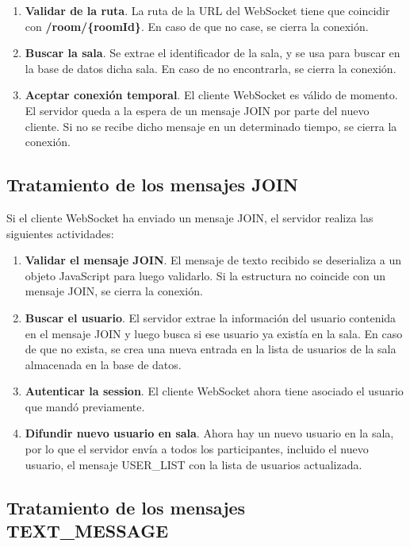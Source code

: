\begin{enumerate}
  \item \textbf{Validar de la ruta}. La ruta de la URL del WebSocket tiene que coincidir con \textbf{/room/\{roomId\}}. En caso de que no case, se cierra la conexión.
  \item \textbf{Buscar la sala}. Se extrae el identificador de la sala, y se usa para buscar en la base de datos dicha sala. En caso de no encontrarla, se cierra la conexión.
  \item \textbf{Aceptar conexión temporal}. El cliente WebSocket es válido de momento. El servidor queda a la espera de un mensaje JOIN por parte del nuevo cliente. Si no se recibe dicho mensaje en un determinado tiempo, se cierra la conexión.
\end{enumerate}

\subsection{Tratamiento de los mensajes JOIN}

Si el cliente WebSocket ha enviado un mensaje JOIN, el servidor realiza las siguientes actividades:

\begin{enumerate}
  \item \textbf{Validar el mensaje JOIN}. El mensaje de texto recibido se deserializa a un objeto JavaScript para luego validarlo. Si la estructura no coincide con un mensaje JOIN, se cierra la conexión.
  \item \textbf{Buscar el usuario}. El servidor extrae la información del usuario contenida en el mensaje JOIN y luego busca si ese usuario ya existía en la sala. En caso de que no exista, se crea una nueva entrada en la lista de usuarios de la sala almacenada en la base de datos.
  \item \textbf{Autenticar la session}. El cliente WebSocket ahora tiene asociado el usuario que mandó previamente.
  \item \textbf{Difundir nuevo usuario en sala}. Ahora hay un nuevo usuario en la sala, por lo que el servidor envía a todos los participantes, incluido el nuevo usuario, el mensaje USER\_LIST con la lista de usuarios actualizada.
\end{enumerate}

\subsection{Tratamiento de los mensajes TEXT\_MESSAGE}

